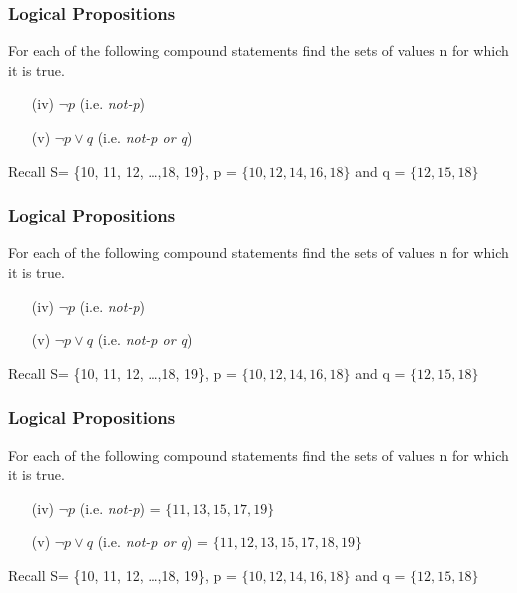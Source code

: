 \documentclass{beamer}
\begin{document}
\begin{frame}
\frametitle{Logical Propositions}
\Large
For each of the following compound statements find the sets of values n for which it is true. \vspace{0.3cm}
\begin{itemize}
\item[(iv)] $\neg p $  (i.e. \textit{not-p}) %
\vspace{0.3cm}
\item[(v)] $\neg p \vee q$  (i.e. \textit{not-p or q}) %
\end{itemize}
\vspace{0.7cm}
\large
Recall S= \{10, 11, 12, \ldots ,18, 19\}, p = $\{10,12,14,16,18\}$  and q = $\{12,15,18\}$
\end{frame}

\begin{frame}
\frametitle{Logical Propositions}
\Large
For each of the following compound statements find the sets of values n for which it is true. \vspace{0.3cm}
\begin{itemize}
\item[(iv)] $\neg p $  (i.e. \textit{not-p}) %
\vspace{0.3cm}
\item[(v)] $\neg p \vee q$  (i.e. \textit{not-p or q}) %
\end{itemize}
\vspace{0.7cm}
\large
Recall S= \{10, 11, 12, \ldots ,18, 19\}, p = $\{10,12,14,16,18\}$  and q = $\{12,15,18\}$
\end{frame}


\begin{frame}
\frametitle{Logical Propositions}
\Large
For each of the following compound statements find the sets of values n for which it is true. \vspace{0.3cm}
\begin{itemize}
\item[(iv)] $\neg p $  (i.e. \textit{not-p}) = $\{ 11, 13, 15, 17, 19\}$
\vspace{0.3cm}
\item[(v)] $\neg p \vee q$  (i.e. \textit{not-p or q}) =  $\{11, 12, 13, 15, 17, 18, 19\}$
\end{itemize}
\vspace{0.7cm}
\large
Recall S= \{10, 11, 12, \ldots ,18, 19\}, p = $\{10,12,14,16,18\}$  and q = $\{12,15,18\}$
\end{frame}
\end{document}
